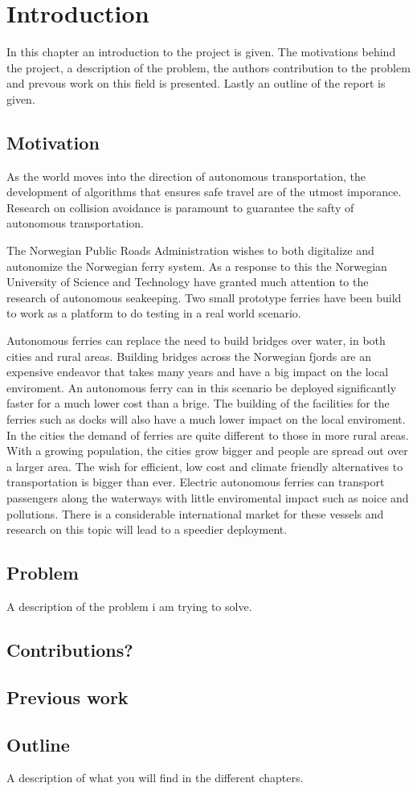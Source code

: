
\chapter{Introduction}
In this chapter an introduction to the project is given. The motivations behind the project,
a description of the problem, the authors contribution to the problem and prevous work on this
field is presented. Lastly an outline of the report is given. 

\section{Motivation}
As the world moves into the direction of autonomous transportation, the development of
algorithms that ensures safe travel are of the utmost imporance. Research on 
collision avoidance is paramount to guarantee the safty of autonomous transportation.

The Norwegian Public Roads Administration wishes to both digitalize and autonomize the Norwegian
ferry system. As a response to this the Norwegian University of Science and Technology have
granted much attention to the research of autonomous seakeeping. Two small prototype ferries have
been build to work as a platform to do testing in a real world scenario.

Autonomous ferries can replace the need to build bridges over water, in both cities and rural areas.
Building bridges across the Norwegian fjords are an expensive endeavor that takes many years and 
have a big impact on the local enviroment. An autonomous ferry can in this scenario be deployed
significantly faster for a much lower cost than a brige. The building of the facilities for the ferries such as
docks will also have a much lower impact on the local enviroment. In the cities the demand of ferries are quite
different to those in more rural areas. With a growing population, the cities grow bigger and people
are spread out over a larger area. The wish for efficient, low cost and climate friendly alternatives to transportation
is bigger than ever. Electric autonomous ferries can transport passengers along the waterways with little enviromental impact
such as noice and pollutions. There is a considerable international market for these vessels and research on this topic will
lead to a speedier deployment. 


\section{Problem}

A description of the problem i am trying to solve. 

\section{Contributions?}

\section{Previous work}

\section{Outline}
A description of what you will find in the different chapters. 

\cleardoublepage